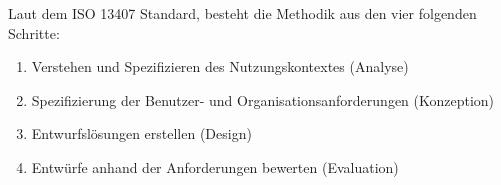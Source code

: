 Laut dem ISO 13407 Standard, besteht die Methodik aus den vier folgenden Schritte:

\begin{enumerate}
	\item Verstehen und Spezifizieren des Nutzungskontextes (Analyse)
	\item Spezifizierung der Benutzer- und Organisationsanforderungen (Konzeption)
	\item Entwurfslösungen erstellen (Design)
	\item Entwürfe anhand der Anforderungen bewerten (Evaluation)
\end{enumerate}




